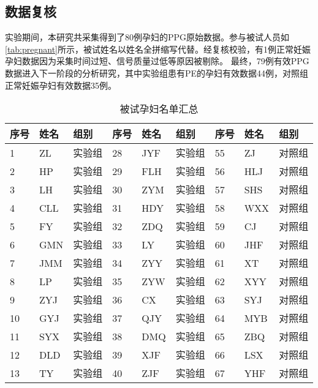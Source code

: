 \subsection{数据复核}
实验期间，本研究共采集得到了80例孕妇的PPG原始数据。参与被试人员如\autoref{tab:pregnant}所示，被试姓名以姓名全拼缩写代替。经复核校验，有1例正常妊娠孕妇数据因为采集时间过短、信号质量过低等原因被剔除。
最终，79例有效PPG数据进入下一阶段的分析研究，其中实验组患有PE的孕妇有效数据44例，对照组正常妊娠孕妇有效数据35例。
\begin{table}[htbp]
      \centering
      \caption{\label{tab:pregnant}被试孕妇名单汇总}
      \begin{tabularx}{\linewidth}{X<{\centering}X<{\centering}X<{\centering}X<{\centering}X<{\centering}X<{\centering}X<{\centering}X<{\centering}X<{\centering}}
      \toprule
      \textbf{序号} & \textbf{姓名} & \textbf{组别} & \textbf{序号} & \textbf{姓名} & \textbf{组别} & \textbf{序号} & \textbf{姓名} & \textbf{组别} \\
      \midrule
      1     & ZL    & 实验组   & 28    & JYF   & 实验组   & 55    & ZJ    & 对照组 \\
      2     & HP    & 实验组   & 29    & FLH   & 实验组   & 56    & HLJ   & 对照组 \\
      3     & LH    & 实验组   & 30    & ZYM   & 实验组   & 57    & SHS   & 对照组 \\
      4     & CLL   & 实验组   & 31    & HDY   & 实验组   & 58    & WXX   & 对照组 \\
      5     & FY    & 实验组   & 32    & ZDQ   & 实验组   & 59    & CJ    & 对照组 \\
      6     & GMN   & 实验组   & 33    & LY    & 实验组   & 60    & JHF   & 对照组 \\
      7     & JMM   & 实验组   & 34    & ZYY   & 实验组   & 61    & XT    & 对照组 \\
      8     & LP    & 实验组   & 35    & ZYW   & 实验组   & 62    & XYY   & 对照组 \\
      9     & ZYJ   & 实验组   & 36    & CX    & 实验组   & 63    & SYJ   & 对照组 \\
      10    & GYJ   & 实验组   & 37    & QJY   & 实验组   & 64    & MYB   & 对照组 \\
      11    & SYX   & 实验组   & 38    & DMQ   & 实验组   & 65    & ZBQ   & 对照组 \\
      12    & DLD   & 实验组   & 39    & XJF   & 实验组   & 66    & LSX   & 对照组 \\
      13    & TY    & 实验组   & 40    & ZJF   & 实验组   & 67    & YHF   & 对照组 \\

\end{tabularx}
\end{table}
